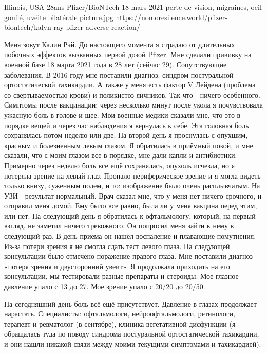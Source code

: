           {Illinois, USA}
          {28ans}
          {Pfizer/BioNTech}
          {18 mars 2021}
          {perte de vision, migraines, oeil gonflé, uvéite bilatérale}
          {picture.jpg}
          {https://nomoresilence.world/pfizer-biontech/kalyn-ray-pfizer-adverse-reaction/}
          {

\normalsize

Меня зовут Калин Рэй. До настоящего момента я страдаю от длительных побочных
эффектов вызванных первой дозой Pfizer. Мне сделали прививку на военной базе 18
марта 2021 года в 28 лет (сейчас 29). Сопутствующие заболевания. В 2016 году мне
поставили диагноз: синдром постуральной ортостатической тахикардии. А также у
меня есть фактор V Лейдена (проблема со свертываемостью крови) и поликистоз
яичников. Так что - ничего особенного. Симптомы после вакцинации: через
несколько минут после укола я почувствовала ужасную боль в голове и шее. Мои
военные медики сказали мне, что это в порядке вещей и через час наблюдения я
вернулась к себе. Эта головная боль сохранялась потом неделю или две. На второй
день я проснулась с опухшим, красным и болезненным левым глазом. Я обратилась в
приёмный покой, и мне сказали, что с моим глазом все в порядке, мне дали капли и
антибиотики. Примерно через неделю боль все ещё сохранялась, опухоль исчезла, но
я потеряла зрение на левый глаз. Пропало периферическое зрение и я могла видеть
только внизу, суженным полем, и то: изображение было очень расплывчатым. На УЗИ
- результат нормальный. Врач сказал мне, что у меня нет ничего срочного, и
отправил меня домой. Ему было все равно, была ли у меня вакцина перед этим, или
нет. На следующий день я обратилась к офтальмологу, который, на первый взгляд,
не заметил ничего тревожного. Он попросил меня зайти к нему в следующий раз. В
день приема он нашёл воспаление и плавающие помутнения. Из-за потери зрения я не
смогла сдать тест левого глаза. На следующей консультации было отмечено
поражение правого глаза. Мне поставили диагноз «потеря зрения и двусторонний
увеит». Я продолжала приходить на его консультации, мы тестировали разные
препараты и стероиды. Мое глазное давление упало с 13 до 27. Мое зрение упало с
20/20 до 20/50.

На сегодняшний день боль всё ещё присутствует. Давление в глазах продолжает
нарастать. Специалисты: офтальмологи, нейроофтальмологи, ретинологи, терапевт и
ревматолог (в сентябре), клиника вегетативной дисфункции (я обращалась туда по
поводу синдрома постуральной ортостатической тахикардии, и они нашли никакой
связи между моими текущими симптомами и тахикардией).

}
